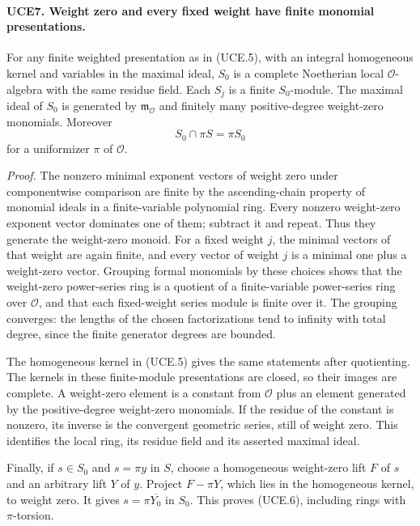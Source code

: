 \documentclass[11pt,a4paper]{article}
\numberwithin{equation}{section}
\theoremstyle{remark}\newtheorem{remark}[theorem]{Remark}
\begin{document}
\paragraph{UCE7. Weight zero and every fixed weight have finite monomial presentations.}
\label{claim:UCE7}
For any finite weighted presentation as in (UCE.5), with an integral
homogeneous kernel and variables in the maximal ideal, \(S_0\) is
a complete Noetherian local \(\mathcal O\)-algebra with the same
residue field.  Each \(S_j\) is a finite \(S_0\)-module.  The
maximal ideal of \(S_0\) is generated by \(\mathfrak m_{\mathcal O}\)
and finitely many positive-degree weight-zero monomials.  Moreover
\[
               S_0\cap\pi S=\pi S_0
 \tag{UCE.6}
\]
for a uniformizer \(\pi\) of \(\mathcal O\).

\emph{Proof.}
The nonzero minimal exponent vectors of weight zero under
componentwise comparison are finite by the ascending-chain property
of monomial ideals in a finite-variable polynomial ring.  Every
nonzero weight-zero exponent vector dominates one of them; subtract
it and repeat.  Thus they generate the weight-zero monoid.  For
a fixed weight \(j\), the minimal vectors of that weight are
again finite, and every vector of weight \(j\) is a minimal one
plus a weight-zero vector.  Grouping formal monomials by these
choices shows that the weight-zero power-series ring is a quotient
of a finite-variable power-series ring over \(\mathcal O\), and
that each fixed-weight series module is finite over it.  The
grouping converges: the lengths of the chosen factorizations tend
to infinity with total degree, since the finite generator degrees
are bounded.

The homogeneous kernel in (UCE.5) gives the same statements after
quotienting.  The kernels in these finite-module presentations are
closed, so their images are complete.  A weight-zero element is
a constant from \(\mathcal O\) plus an element generated by the
positive-degree weight-zero monomials.  If the residue of the
constant is nonzero, its inverse is the convergent geometric series,
still of weight zero.  This identifies the local ring, its residue
field and its asserted maximal ideal.

Finally, if \(s\in S_0\) and \(s=\pi y\) in \(S\), choose
a homogeneous weight-zero lift \(F\) of \(s\) and an arbitrary
lift \(Y\) of \(y\).  Project \(F-\pi Y\), which lies in
the homogeneous kernel, to weight zero.  It gives
\(s=\pi\overline{Y_0}\) in \(S_0\).  This proves (UCE.6),
including rings with \(\pi\)-torsion.
\end{document}
